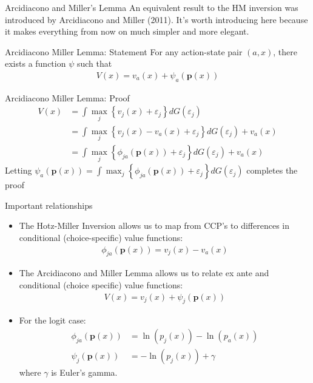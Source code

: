 \documentclass[aspectratio=169,11pt]{beamer}
\begin{document}
\begin{frame}{Arcidiacono and Miller's Lemma}
An equivalent result to the HM inversion was introduced by Arcidiacono and Miller (2011). 
It's worth introducing here because it makes everything from now on much simpler
and more elegant.
\begin{block}{Arcidiacono Miller Lemma: Statement}
For any action-state pair $\left(a,x\right)$, there exists a function
$\psi$ such that 
\begin{align*}
V\left(x\right)=v_{a}\left(x\right)+\psi_{a}\left(\symbf{p}\left(x\right)\right)
\end{align*}
\end{block}
\end{frame}

\begin{frame}{Arcidiacono Miller Lemma: Proof}
\begin{align*}
V\left(x\right) &=  \int\max_{j}\left\{ v_{j}\left(x\right)+\varepsilon_{j}\right\} dG\left(\varepsilon_{j}\right)\\
 &= \int\max_{j}\left\{ v_{j}\left(x\right)-v_{a}\left(x\right)+\varepsilon_{j}\right\} dG\left(\varepsilon_{j}\right)+v_{a}\left(x\right)\\
 &=  \int\max_{j}\left\{ \phi_{ja}\left(\symbf{p}\left(x\right)\right)+\varepsilon_{j}\right\} dG\left(\varepsilon_{j}\right)+v_{a}\left(x\right)
\end{align*}
Letting $\psi_{a}\left(\symbf{p}\left(x\right)\right)=\int\max_{j}\left\{ \phi_{ja}\left(\symbf{p}\left(x\right)\right)+\varepsilon_{j}\right\} dG\left(\varepsilon_{j}\right)$ completes the proof
\end{frame}

\begin{frame}{Important relationships}
\small
\begin{itemize}
\item The Hotz-Miller Inversion allows us to map from CCP's to differences
in conditional (choice-specific) value functions:
\begin{align*}
\phi_{ja}\left(\symbf{p}\left(x\right)\right)=v_{j}\left(x\right)-v_{a}\left(x\right)
\end{align*}
\item The Arcidiacono and Miller Lemma allows us to relate ex ante and conditional (choice specific)
value functions: 
\begin{align*}
V\left(x\right)=v_{j}\left(x\right)+\psi_{j}\left(\symbf{p}\left(x\right)\right)
\end{align*}
\item For the logit case:
\begin{align*}
\phi_{ja}\left(\symbf{p}\left(x\right)\right) & = \ln\left(p_{j}\left(x\right)\right)-\ln\left(p_{a}\left(x\right)\right)\\
\psi_{j}\left(\symbf{p}\left(x\right)\right) & =  -\ln\left(p_{j}\left(x\right)\right)+\gamma
\end{align*}
where $\gamma$ is Euler's gamma.
\end{itemize}
\end{frame}
\end{document}
